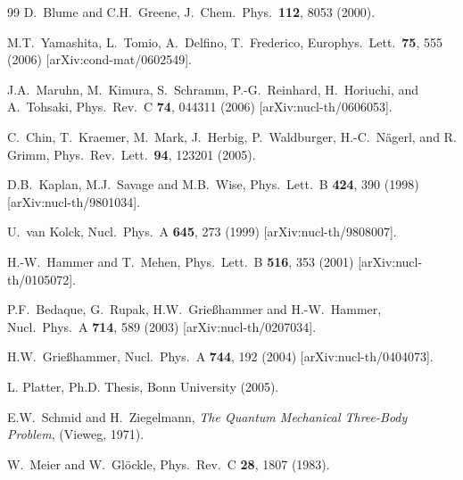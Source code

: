 \documentclass[prc,preprint,showpacs,tightenlines,%
nofootinbib]{revtex4}
\begin{document}
\begin{thebibliography}{99}
D.~Blume and C.H.~Greene, J.\ Chem.\ Phys.\ {\bf 112}, 8053 (2000).

M.T.~Yamashita, L.~Tomio, A.~Delfino, T.~Frederico,
Europhys.\ Lett.\ {\bf 75}, 555 (2006)
[arXiv:cond-mat/0602549].

J.A.~Maruhn, M.~Kimura, S.~Schramm, P.-G.~Reinhard, H.~Horiuchi,
and A.~Tohsaki, 
Phys.\ Rev.\ C {\bf 74}, 044311 (2006)
[arXiv:nucl-th/0606053].

C.~Chin, T.~Kraemer, M.~Mark, J.~Herbig, P.~Waldburger, 
H.-C.~N\"agerl, and R. Grimm, 
Phys.\ Rev.\ Lett.\ {\bf 94}, 123201 (2005).

D.B.~Kaplan, M.J.~Savage and M.B.~Wise,
Phys.\ Lett.\ B {\bf 424}, 390 (1998)
[arXiv:nucl-th/9801034].

U.~van Kolck,
Nucl.\ Phys.\ A {\bf 645}, 273 (1999)
[arXiv:nucl-th/9808007].

H.-W.~Hammer and T.~Mehen,
Phys.\ Lett.\ B {\bf 516}, 353 (2001)
[arXiv:nucl-th/0105072].

P.F.~Bedaque, G.~Rupak, H.W.~Grie\ss hammer and H.-W.~Hammer,
Nucl.\ Phys.\ A {\bf 714}, 589 (2003)
[arXiv:nucl-th/0207034].

  H.W.~Grie\ss hammer,
  Nucl.\ Phys.\ A {\bf 744}, 192 (2004)
  [arXiv:nucl-th/0404073].

L. Platter, Ph.D. Thesis, Bonn University (2005).

E.W.~Schmid and H.~Ziegelmann, {\it The Quantum Mechanical Three-Body
  Problem}, (Vieweg, 1971).

W.~Meier and W.~Gl\"ockle,
Phys.\ Rev.\ C {\bf 28}, 1807 (1983).


\end{thebibliography}
\end{document}
